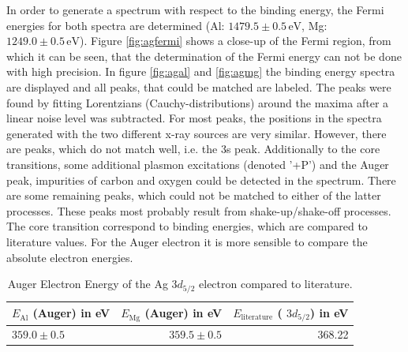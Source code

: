 \documentclass[a4paper]{scrartcl}
\numberwithin{equation}{section}
\numberwithin{figure}{section}
\numberwithin{table}{section}
\begin{document}
In order to generate a spectrum with respect to the binding energy, the Fermi energies for both spectra are determined (Al: $1479.5 \pm 0.5 \,\text{eV}$, Mg: $1249.0\pm 0.5 \,\text{eV}$). Figure \ref{fig:agfermi} shows a close-up of the Fermi region, from which it can be seen, that the determination of the Fermi energy can not be done with high precision. In figure \ref{fig:agal} and \ref{fig:agmg} the binding energy spectra are displayed and all peaks, that could be matched are labeled. The peaks were found by fitting Lorentzians (Cauchy-distributions) around the maxima after a linear noise level was subtracted. For most peaks, the positions in the spectra generated with the two different x-ray sources are very similar. However, there are peaks, which do not match well, i.e. the 3s peak. Additionally to the core transitions, some additional plasmon excitations (denoted '+P') and the Auger peak, impurities of carbon and oxygen could be detected in the spectrum. There are some remaining peaks, which could not be matched to either of the latter processes. These peaks most probably result from shake-up/shake-off processes.
The core transition correspond to binding energies, which are compared to literature values. For the Auger electron it is more sensible to compare the absolute electron energies.
\begin{table}
\centering
\begin{tabular}{lrr}
\toprule
$E_\text{Al}$ (Auger) in eV & $E_\text{Mg}$ (Auger) in eV  & $E_\text{literature}$ ( $3d_{5/2}$) in eV  \\
\midrule
 $359.0 \pm 0.5$ &$ 359.5 \pm 0.5$ & 368.22 \\
 \bottomrule
 \end{tabular}
 \caption{ \small Auger Electron Energy of the Ag $3d_{5/2}$ electron compared to literature.\cite{augerpaper}}
 \label{tab:auger}
\end{table}
\end{document}
